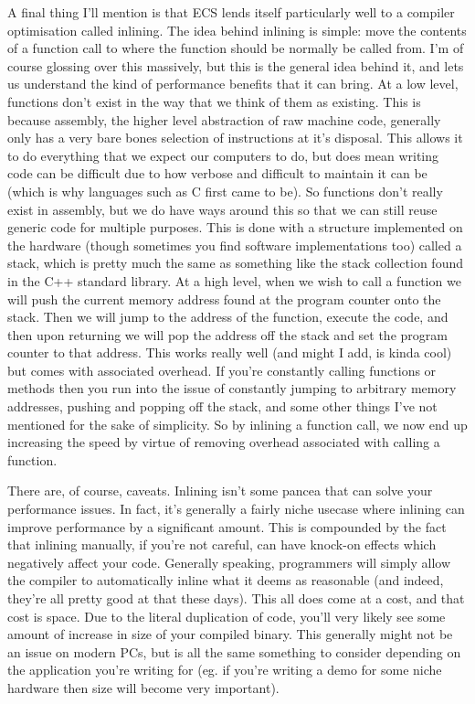 \documentclass{article}
\begin{document}
A final thing I'll mention is that ECS lends itself particularly well to a
compiler optimisation called inlining. The idea behind inlining is simple: move
the contents of a function call to where the function should be normally be
called from. I'm of course glossing over this massively, but this is the general
idea behind it, and lets us understand the kind of performance benefits that it
can bring. At a low level, functions don't exist in the way that we think of
them as existing. This is because assembly, the higher level abstraction of raw
machine code, generally only has a very bare bones selection of instructions at
it's disposal. This allows it to do everything that we expect our computers to
do, but does mean writing code can be difficult due to how verbose and
difficult to maintain it can be (which is why languages such as C first came to
be). So functions don't really exist in assembly, but we do have ways around
this so that we can still reuse generic code for multiple purposes. This is
done with a structure implemented on the hardware (though sometimes you find
software implementations too) called a stack, which is pretty much the same as
something like the stack collection found in the C++ standard library. At a high
level, when we wish to call a function we will push the current memory address
found at the program counter onto the stack. Then we will jump to the address of
the function, execute the code, and then upon returning we will pop the address
off the stack and set the program counter to that address. This works really
well (and might I add, is kinda cool) but comes with associated overhead. If
you're constantly calling functions or methods then you run into the issue of
constantly jumping to arbitrary memory addresses, pushing and popping off the
stack, and some other things I've not mentioned for the sake of simplicity.
So by inlining a function call, we now end up increasing the speed by virtue
of removing overhead associated with calling a function.

There are, of course, caveats. Inlining isn't some pancea that can solve your
performance issues. In fact, it's generally a fairly niche usecase where
inlining can improve performance by a significant amount. This is compounded
by the fact that inlining manually, if you're not careful, can have knock-on
effects which negatively affect your code. Generally speaking, programmers
will simply allow the compiler to automatically inline what it deems as
reasonable (and indeed, they're all pretty good at that these days). This all
does come at a cost, and that cost is space. Due to the literal duplication of
code, you'll very likely see some amount of increase in size of your compiled
binary. This generally might not be an issue on modern PCs, but is all the
same something to consider depending on the application you're writing for
(eg. if you're writing a demo for some niche hardware then size will become
very important).
\end{document}

